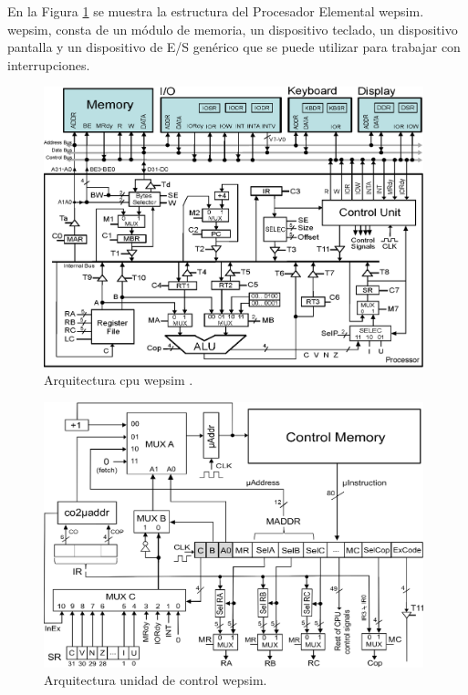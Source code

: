 En la Figura \ref{fig:wepsimCPU_figure} se muestra la estructura del Procesador Elemental \acrshort{wepsim}. \acrshort{wepsim}, consta de un módulo de memoria, un dispositivo teclado, un dispositivo pantalla y un dispositivo de E/S genérico que se puede utilizar para trabajar con interrupciones.

\begin{figure}[htbp]
 	\centering
 	\includegraphics[width=11cm]{figures/processor6}
 	\caption{Arquitectura \acrshort{cpu} \acrshort{wepsim} .}
	\label{fig:wepsimCPU_figure}
\end{figure}

\begin{figure}[htbp]
 	\centering
 	\includegraphics[width=11cm]{figures/controlunit6}
 	\caption{Arquitectura unidad de control \acrshort{wepsim}.}
	\label{fig:wepsimCU_figure}
\end{figure}

